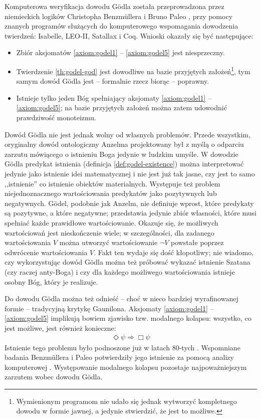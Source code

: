 \documentclass[
	runningheads
]{llncs}
\begin{document}
Komputerowa weryfikacja dowodu G\"odla została przeprowadzona przez niemieckich logików Christopha Benzm\"ullera i Bruno Paleo \cite{benzmuller2014}, \cite{benzmuller2016} przy pomocy znanych programów służących do komputerowego wspomagania dowodzenia twierdzeń: Isabelle, LEO-II, Satallax i Coq. Wnioski okazały się być następujące:
\begin{itemize}
	\item Zbiór aksjomatów \ref{axiom:godel1} -- \ref{axiom:godel5} jest niesprzeczny. 
	\item Twierdzenie \ref{th:godel-god} jest dowodliwe na bazie przyjętych założeń\footnote{Wymienionym programom nie udało się jednak wytworzyć kompletnego dowodu w formie jawnej, a jedynie stwierdzić, że jest to możliwe.}, tym samym dowód G\"odla jest -- formalnie rzecz biorąc -- poprawny.
	\item Istnieje tylko jeden Bóg spełniający aksjomaty \ref{axiom:godel1} -- \ref{axiom:godel5}; na bazie przyjętych założeń można zatem udowodnić prawdziwość monoteizmu. 
\end{itemize}
Dowód G\"odla nie jest jednak wolny od własnych problemów. Przede wszystkim, oryginalny dowód ontologiczny Anzelma projektowany był z myślą o odparciu zarzutu mówiącego o istnieniu Boga jedynie w ludzkim umyśle. W dowodzie G\"odla predykat istnienia (definicja \ref{def:godel-existence}) można interpretować jedynie jako istnienie idei matematycznej i nie jest już tak jasne, czy jest to samo ,,istnienie'' co istnienie obiektów materialnych. Występuje też problem niejednoznacznego wartościowania predykatów jako pozytywnych lub negatywnych. G\"odel, podobnie jak Anzelm, nie definiuje wprost, które predykaty są pozytywne, a które negatywne; przedstawia jedynie zbiór własności, które musi spełniać każde prawidłowe wartościowanie. Okazuje się, że możliwych wartościowań jest nieskończenie wiele; w szczególności, dla zadanego wartościowania $V$ można utworzyć wartościowanie $\neg V$ powstałe poprzez odwrócenie wartościowania $V$. Fakt ten wydaje się dość kłopotliwy; nie wiadomo, czy wykorzystując dowód G\"odla można też próbować wykazać istnienie Szatana (czy raczej anty-Boga) i czy dla każdego możliwego wartościowania istnieje osobny Bóg, który je realizuje. 

Do dowodu G\"odla można też odnieść -- choć w nieco bardziej wyrafinowanej formie -- tradycyjną krytykę Gaunilona. Aksjomaty \ref{axiom:godel1} -- \ref{axiom:godel5} implikują bowiem zjawisko tzw. modalnego kolapsu: wszystko, co jest możliwe, jest również konieczne:
\begin{align*}
\Diamond \psi \Rightarrow \Box \psi
\end{align*}
Istnienie tego problemu było podnoszone już w latach 80-tych \cite{sobel1987}. Wspomniane badania Benzm\"ullera i Paleo potwierdziły jego istnienie za pomocą analizy komputerowej \cite{benzmuller2014}. Występowanie modalnego kolapsu pozostaje najpoważniejszym zarzutem wobec dowodu G\"odla. 
\end{document}
